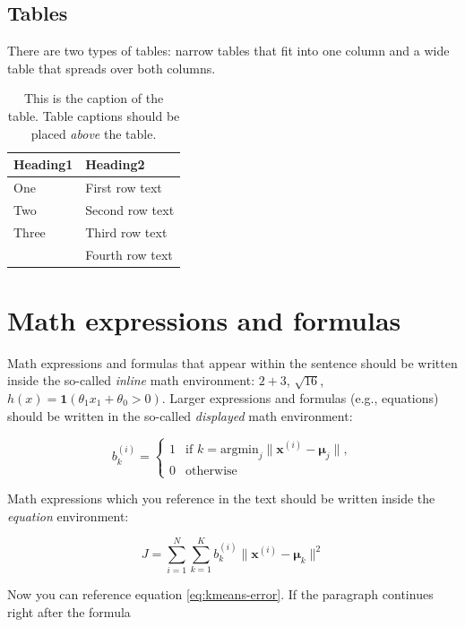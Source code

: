 \documentclass[10pt, a4paper]{article}
\begin{document}
\subsection{Tables}

There are two types of tables: narrow tables that fit into one column and a wide table that spreads over both columns.

\begin{table}
\caption{This is the caption of the table. Table captions should be placed \textit{above} the table.}
\begin{center}
\begin{tabular}{ll}
\toprule
Heading1 & Heading2 \\
\midrule
One & First row text \\
Two   & Second row text \\
Three   & Third row text \\
      & Fourth row text \\
\bottomrule
\end{tabular}
\end{center}
\end{table}

\section{Math expressions and formulas}

Math expressions and formulas that appear within the sentence should be written inside the so-called \emph{inline} math environment: $2+3$, $\sqrt{16}$, $h(x)=\mathbf{1}(\theta_1 x_1 + \theta_0>0)$. Larger expressions and formulas (e.g., equations) should be written in the so-called \emph{displayed} math environment:

\[
b^{(i)}_k = \begin{cases}
1 & \text{if 
    $k = \text{argmin}_j \| \mathbf{x}^{(i)} - \mathbf{\mu}_j \|,$}\\
0 & \text{otherwise}
\end{cases}
\]

Math expressions which you reference in the text should be written inside the \textit{equation} environment:

\begin{equation}\label{eq:kmeans-error}
J = \sum_{i=1}^N \sum_{k=1}^K 
b^{(i)}_k \| \mathbf{x}^{(i)} - \mathbf{\mu}_k \|^2
\end{equation}

Now you can reference equation \eqref{eq:kmeans-error}. If the paragraph continues right after the formula
\end{document}
